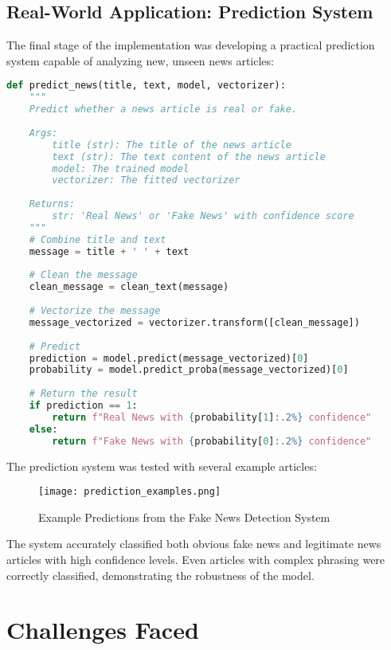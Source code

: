 \documentclass[12pt]{article}
\begin{document}
\subsection{Real-World Application: Prediction System}

The final stage of the implementation was developing a practical prediction system capable of analyzing new, unseen news articles:

\begin{lstlisting}[language=Python, caption=Prediction Function Implementation]
def predict_news(title, text, model, vectorizer):
    """
    Predict whether a news article is real or fake.
    
    Args:
        title (str): The title of the news article
        text (str): The text content of the news article
        model: The trained model
        vectorizer: The fitted vectorizer
    
    Returns:
        str: 'Real News' or 'Fake News' with confidence score
    """
    # Combine title and text
    message = title + ' ' + text
    
    # Clean the message
    clean_message = clean_text(message)
    
    # Vectorize the message
    message_vectorized = vectorizer.transform([clean_message])
    
    # Predict
    prediction = model.predict(message_vectorized)[0]
    probability = model.predict_proba(message_vectorized)[0]
    
    # Return the result
    if prediction == 1:
        return f"Real News with {probability[1]:.2%} confidence"
    else:
        return f"Fake News with {probability[0]:.2%} confidence"
\end{lstlisting}

The prediction system was tested with several example articles:

\begin{figure}[h]
    \centering
    \texttt{[image: prediction\_examples.png]}
    \caption{Example Predictions from the Fake News Detection System}
\end{figure}

The system accurately classified both obvious fake news and legitimate news articles with high confidence levels. Even articles with complex phrasing were correctly classified, demonstrating the robustness of the model.

\section{Challenges Faced}
\end{document}
